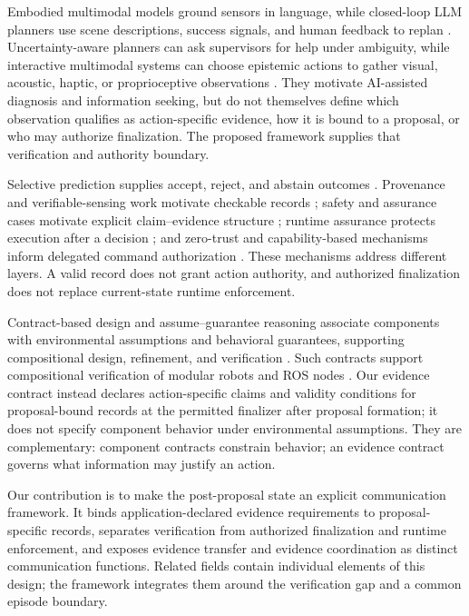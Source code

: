 Embodied multimodal models ground sensors in language, while
closed-loop LLM planners use scene descriptions, success signals, and human
feedback to replan \cite{palme,innermonologue}. Uncertainty-aware planners can
ask supervisors for help under ambiguity, while interactive multimodal systems
can choose epistemic actions to gather visual, acoustic, haptic, or
proprioceptive observations \cite{knowno,chatenv}. They motivate AI-assisted
diagnosis and information seeking, but do not themselves define which
observation qualifies as action-specific evidence, how it is bound to a
proposal, or who may authorize finalization. The proposed framework supplies
that verification and authority boundary.

Selective prediction supplies accept, reject, and abstain outcomes
\cite{selectivenet}. Provenance and verifiable-sensing work motivate checkable
records \cite{prov,proofsensing,verifiablesemantics}; safety and assurance cases
motivate explicit claim--evidence structure \cite{gsn3}; runtime assurance
protects execution after a decision \cite{rta}; and zero-trust and
capability-based mechanisms inform delegated command authorization
\cite{nistzt,macaroons}. These mechanisms address different layers. A valid
record does not grant action authority, and authorized finalization does not
replace current-state runtime enforcement.

Contract-based design and assume--guarantee reasoning associate components
with environmental assumptions and behavioral guarantees, supporting
compositional design, refinement, and verification
\cite{benvenistecontracts}. Such contracts support compositional verification
of modular robots and ROS nodes \cite{luckcuckrobotics}. Our evidence contract
instead declares action-specific claims and validity conditions for
proposal-bound records at the permitted finalizer after proposal formation; it
does not specify component behavior under environmental assumptions. They are
complementary: component contracts constrain behavior; an evidence contract
governs what information may justify an action.

Our contribution is to make the post-proposal state an explicit communication
framework. It binds application-declared evidence requirements to
proposal-specific records, separates verification from authorized finalization
and runtime enforcement, and exposes evidence transfer and evidence
coordination as distinct communication functions. Related fields contain
individual elements of this design; the framework integrates them around the
verification gap and a common episode boundary.

